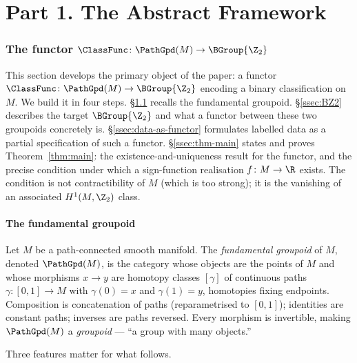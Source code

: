 \part*{Part 1. The Abstract Framework}

\section{The functor $\ClassFunc \colon \PathGpd(M) \to \BGroup{\Z_2}$}
\label{sec:functor}

This section develops the primary object of the paper: a functor
$\ClassFunc\colon\PathGpd(M)\to\BGroup{\Z_2}$ encoding a binary
classification on $M$. We build it in four steps. \S\ref{ssec:groupoid}
recalls the fundamental groupoid. \S\ref{ssec:BZ2} describes the target
$\BGroup{\Z_2}$ and what a functor between these two groupoids
concretely is. \S\ref{ssec:data-as-functor} formulates labelled data
as a partial specification of such a functor.
\S\ref{ssec:thm-main} states and proves Theorem~\ref{thm:main}: the
existence-and-uniqueness result for the functor, and the precise
condition under which a sign-function realisation
$f\colon M\to\R$ exists. The condition is not contractibility of $M$
(which is too strong); it is the vanishing of an associated
$H^1(M,\Z_2)$ class.

\subsection{The fundamental groupoid}\label{ssec:groupoid}

Let $M$ be a path-connected smooth manifold. The \emph{fundamental
groupoid} of $M$, denoted $\PathGpd(M)$, is the category whose objects
are the points of $M$ and whose morphisms $x\to y$ are homotopy classes
$[\gamma]$ of continuous paths $\gamma\colon[0,1]\to M$ with
$\gamma(0)=x$ and $\gamma(1)=y$, homotopies fixing endpoints.
Composition is concatenation of paths (reparametrised to $[0,1]$);
identities are constant paths; inverses are paths reversed. Every
morphism is invertible, making $\PathGpd(M)$ a \emph{groupoid} ---
``a group with many objects.''

Three features matter for what follows.

